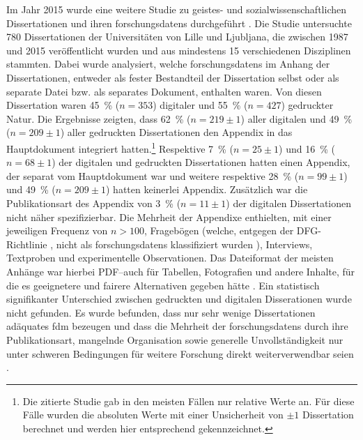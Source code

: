 Im Jahr 2015 wurde eine weitere Studie zu geistes- und sozialwissenschaftlichen Dissertationen und ihren \glspl{forschungsdaten} durchgeführt \autocite{Schöpfel2015}.
Die Studie untersuchte \num{780} Dissertationen der Universitäten von Lille und Ljubljana, die zwischen 1987 und 2015 veröffentlicht wurden und aus mindestens 15 verschiedenen Disziplinen stammten.
Dabei wurde analysiert, welche \glspl{forschungsdaten} im Anhang der Dissertationen, entweder als fester Bestandteil der Dissertation selbst oder als separate Datei bzw. als separates Dokument, enthalten waren.
Von diesen Dissertation waren \SI{45}{\percent} ($n=\num{353}$) digitaler und \SI{55}{\percent} ($n=\num{427}$) gedruckter Natur.
Die Ergebnisse zeigten, dass \SI{62}{\percent} ($n=\num{219}\pm 1$) aller digitalen und \SI{49}{\percent} ($n=\num{209}\pm 1$) aller gedruckten Dissertationen den Appendix in das Hauptdokument integriert hatten.\footnote{Die zitierte Studie gab in den meisten Fällen nur relative Werte an. Für diese Fälle wurden die absoluten Werte mit einer Unsicherheit von $\pm 1$ Dissertation berechnet und werden hier entsprechend gekennzeichnet.}
Respektive \SI{7}{\percent} ($n=\num{25}\pm 1$) und \SI{16}{\percent} ($n=\num{68}\pm 1$) der digitalen und gedruckten Dissertationen hatten einen Appendix, der separat vom Hauptdokument war und weitere respektive \SI{28}{\percent} ($n=\num{99}\pm 1$) und \SI{49}{\percent} ($n=\num{209}\pm 1$) hatten keinerlei Appendix.
Zusätzlich war die Publikationsart des Appendix von \SI{3}{\percent} ($n=\num{11}\pm 1$) der digitalen Dissertationen nicht näher spezifizierbar.
Die Mehrheit der Appendixe enthielten, mit einer jeweiligen Frequenz von $n>\num{100}$, Fragebögen (welche, entgegen der DFG-Richtlinie \autocite{dfg-richtlinie}, nicht als \glspl{forschungsdaten} klassifiziert wurden \autocite[14]{Schöpfel2015}), Interviews, Textproben und experimentelle Observationen.
Das Dateiformat der meisten Anhänge war hierbei PDF--auch für Tabellen, Fotografien und andere Inhalte, für die es geeignetere und \gls{fair}ere Alternativen gegeben hätte \autocite[14]{Schöpfel2015}.
Ein statistisch signifikanter Unterschied zwischen gedruckten und digitalen Disserationen wurde nicht gefunden.
Es wurde befunden, dass nur sehr wenige Dissertationen adäquates \gls{fdm} bezeugen und dass die Mehrheit der \glspl{forschungsdaten} durch ihre Publikationsart, mangelnde Organisation sowie generelle Unvollständigkeit nur unter schweren Bedingungen für weitere Forschung direkt weiterverwendbar seien \autocite[S.~20f.]{Schöpfel2015}.

